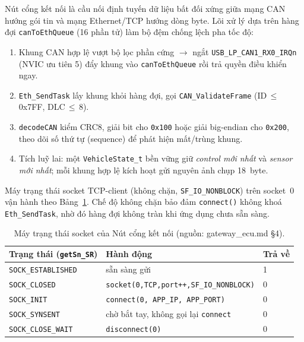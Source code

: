 \documentclass[../DoAn.tex]{subfiles}
\begin{document}
Nút cổng kết nối là cầu nối định tuyến dữ liệu bất đối xứng giữa mạng CAN hướng
gói tin và mạng Ethernet/TCP hướng dòng byte. Lõi xử lý dựa trên hàng đợi
\texttt{canToEthQueue} (16 phần tử) làm bộ đệm chống lệch pha tốc độ:

\begin{enumerate}
  \item Khung CAN hợp lệ vượt bộ lọc phần cứng $\to$ ngắt \texttt{USB\_LP\_CAN1\_RX0\_IRQn}
    (NVIC ưu tiên 5) đẩy khung vào \texttt{canToEthQueue} rồi trả quyền điều khiển ngay.
  \item \texttt{Eth\_SendTask} lấy khung khỏi hàng đợi, gọi
    \texttt{CAN\_ValidateFrame} (ID\,$\le$\,0x7FF, DLC\,$\le$\,8).
  \item \texttt{decodeCAN} kiểm CRC8, giải bit cho \texttt{0x100} hoặc giải
    big-endian cho \texttt{0x200}, theo dõi số thứ tự (sequence) để phát hiện
    mất/trùng khung.
  \item Tích luỹ lai: một \texttt{VehicleState\_t} bền vững giữ \emph{control mới
    nhất} và \emph{sensor mới nhất}; mỗi khung hợp lệ kích hoạt gửi nguyên ảnh
    chụp 18~byte.
\end{enumerate}

Máy trạng thái socket TCP-client (không chặn, \texttt{SF\_IO\_NONBLOCK}) trên
socket~0 vận hành theo Bảng~\ref{tab:sock-fsm}. Chế độ không chặn bảo đảm
\texttt{connect()} không khoá \texttt{Eth\_SendTask}, nhờ đó hàng đợi không tràn
khi ứng dụng chưa sẵn sàng.

\begin{table}[H]
  \centering
  \caption{Máy trạng thái socket của Nút cổng kết nối (nguồn: gateway\_ecu.md §4).}
  \label{tab:sock-fsm}
  \begin{tabular}{@{}lll@{}}
    \toprule
    \textbf{Trạng thái (\texttt{getSn\_SR})} & \textbf{Hành động} & \textbf{Trả về} \\
    \midrule
    \texttt{SOCK\_ESTABLISHED} & sẵn sàng gửi & 1 \\
    \texttt{SOCK\_CLOSED} & \texttt{socket(0,TCP,port++,SF\_IO\_NONBLOCK)} & 0 \\
    \texttt{SOCK\_INIT} & \texttt{connect(0, APP\_IP, APP\_PORT)} & 0 \\
    \texttt{SOCK\_SYNSENT} & chờ bắt tay, không gọi lại \texttt{connect} & 0 \\
    \texttt{SOCK\_CLOSE\_WAIT} & \texttt{disconnect(0)} & 0 \\
    \bottomrule
  \end{tabular}
\end{table}
\end{document}
